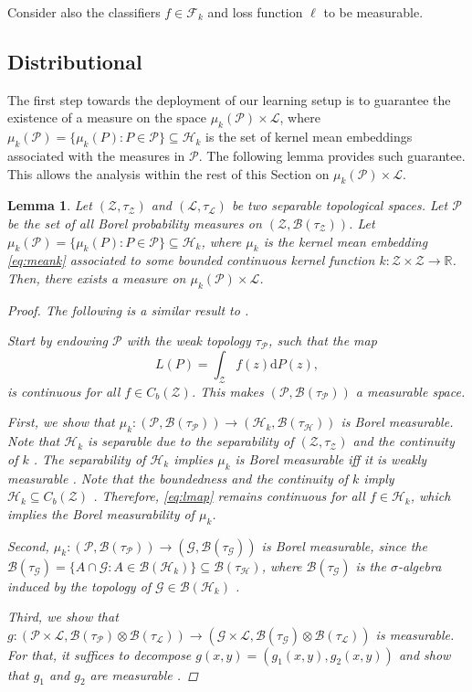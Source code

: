 \documentclass{article}
\newtheorem{lemma}{Lemma}
\renewcommand{\P}{\mathcal{P}}
\renewcommand{\H}{\mathcal{H}}
\newcommand{\F}{\mathcal{F}}
\newcommand{\Z}{\mathcal{Z}}
\newcommand{\R}{\mathbb{R}}
\newcommand{\B}{\mathcal{B}}
\renewcommand{\L}{\mathcal{L}}
\renewcommand{\d}{\mathrm{d}}
\newcommand{\G}{\mathcal{G}}
\newcommand{\muP}{\mu_k(\P)}
\begin{document}
Consider also the classifiers $f \in \F_k$ and loss function $\ell$ to be measurable.

\subsection{Distributional}\label{sec:measurability_distrib}

The first step towards the deployment of our learning setup is to guarantee the
existence of a measure on the space $\muP \times \L$, where $\muP = \{\mu_k(P)
: P \in \P \} \subseteq \H_k$ is the set of kernel mean embeddings associated
with the measures in $\P$.  The following lemma provides such guarantee.  This
allows the analysis within the rest of this Section on ${\muP \times \L}$.

\begin{lemma}\label{lemma:measurability}
  Let $(\Z, \tau_\Z)$ and $(\L, \tau_\L)$ be two separable topological spaces.
  Let $\P$ be the set of all Borel probability measures on $(\Z,\B(\tau_\Z))$.
  Let $\muP = \{ \mu_k(P) : P \in \P \} \subseteq \H_k$, where $\mu_k$ is the
  kernel mean embedding \eqref{eq:meank} associated to some bounded continuous
  kernel function $k : \Z \times \Z \to \R$.  Then, there exists a measure on
  $\muP \times \L$.
  \begin{proof}
    The following is a similar result to \citet[Proof 3]{Szabo14b}.
    
    Start by endowing $\P$ with the weak topology $\tau_\P$, such that the map
    \begin{equation}\label{eq:lmap}
      L(P) = \int_\Z f(z)\d P(z),
    \end{equation}
    is continuous for all $f \in C_b(\Z)$. This makes $(\P,\B(\tau_\P))$ a
    measurable space.
    
    First, we show that $\mu_k : (\P,\B(\tau_\P)) \to (\H_k,\B(\tau_\H))$ is Borel
    measurable. Note that $\H_k$ is separable due to the separability of $(\Z,
    \tau_\Z)$ and the continuity of $k$ \citep[Lemma 4.33]{Steinwart08}. The
    separability of $\H_k$ implies $\mu_k$ is Borel measurable iff it is weakly
    measurable \citep[Thm.  IV.22]{Reed72}.  Note that the boundedness and the
    continuity of $k$ imply $\H_k \subseteq C_b(\Z)$ \citep[Lemma
    4.28]{Steinwart08}. Therefore, \eqref{eq:lmap} remains continuous for all $f\in
    \H_k$, which implies the Borel measurability of $\mu_k$.
    
    Second, $\mu_k : (\P, \B(\tau_\P)) \to (\G, \B(\tau_\G))$ is Borel measurable,
    since the $\B(\tau_\G) = \{ A \cap \G : A \in \B(\H_k)\} \subseteq
    \B(\tau_\H)$, where $\B(\tau_\G)$ is the $\sigma$-algebra induced by the
    topology of $\G \in \B(\H_k)$ \citep{Szabo14b}.
    
    Third, we show that $g : (\P \times \L, \B(\tau_\P) \otimes \B(\tau_\L)) \to
    (\G \times \L, \B(\tau_\G) \otimes \B(\tau_\L))$ is measurable. For that, it
    suffices to decompose $g(x,y) = (g_1(x,y),g_2(x,y))$ and show that $g_1$ and
    $g_2$ are measurable \citep{Szabo14b}.
  \end{proof}
\end{lemma}
\end{document}
